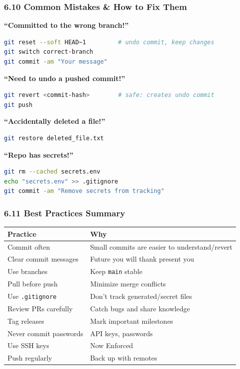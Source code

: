 \documentclass{beamer}
\begin{document}
\begin{frame}[fragile]
\frametitle{6.10 Common Mistakes \& How to Fix Them}

\textbf{``Committed to the wrong branch!''}
\begin{lstlisting}[language=bash]
git reset --soft HEAD~1         # undo commit, keep changes
git switch correct-branch
git commit -am "Your message"
\end{lstlisting}

\textbf{``Need to undo a pushed commit!''}
\begin{lstlisting}[language=bash]
git revert <commit-hash>        # safe: creates undo commit
git push
\end{lstlisting}

\textbf{``Accidentally deleted a file!''}
\begin{lstlisting}[language=bash]
git restore deleted_file.txt
\end{lstlisting}

\textbf{``Repo has secrets!''}
\begin{lstlisting}[language=bash]
git rm --cached secrets.env
echo "secrets.env" >> .gitignore
git commit -am "Remove secrets from tracking"
\end{lstlisting}
\end{frame}

\begin{frame}
\frametitle{6.11 Best Practices Summary}
\begin{table}[h]
\centering
\scriptsize
\begin{tabular}{ll}
\toprule
\textbf{Practice} & \textbf{Why} \\
\midrule
Commit often & Small commits are easier to understand/revert \\
Clear commit messages & Future you will thank present you \\
Use branches & Keep \texttt{main} stable \\
Pull before push & Minimize merge conflicts \\
Use \texttt{.gitignore} & Don't track generated/secret files \\
Review PRs carefully & Catch bugs and share knowledge \\
Tag releases & Mark important milestones \\
Never commit passwords & API keys, passwords  \\
Use SSH keys & Now Enforced \\
Push regularly & Back up with remotes \\
\bottomrule
\end{tabular}
\end{table}
\end{frame}
\end{document}
